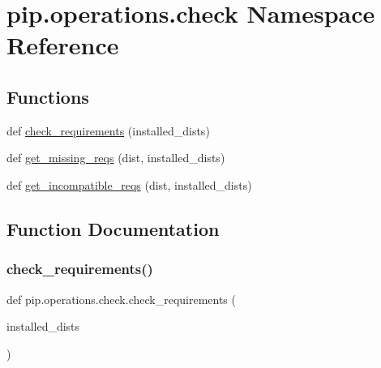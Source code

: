 \hypertarget{namespacepip_1_1operations_1_1check}{}\section{pip.\+operations.\+check Namespace Reference}
\label{namespacepip_1_1operations_1_1check}
\subsection*{Functions}
\begin{DoxyCompactItemize}
\item 
def \hyperlink{namespacepip_1_1operations_1_1check_a9bb13580a249c6a12a0f5d6055e2ce89}{check\+\_\+requirements} (installed\+\_\+dists)
\item 
def \hyperlink{namespacepip_1_1operations_1_1check_a8144e204678212ff692cc906ad803418}{get\+\_\+missing\+\_\+reqs} (dist, installed\+\_\+dists)
\item 
def \hyperlink{namespacepip_1_1operations_1_1check_a63bea8d327dc115fa6bc1458193f340c}{get\+\_\+incompatible\+\_\+reqs} (dist, installed\+\_\+dists)
\end{DoxyCompactItemize}


\subsection{Function Documentation}
\mbox{\label{namespacepip_1_1operations_1_1check_a9bb13580a249c6a12a0f5d6055e2ce89}} 
\subsubsection{\texorpdfstring{check\+\_\+requirements()}{check\_requirements()}}
{\footnotesize\ttfamily def pip.\+operations.\+check.\+check\+\_\+requirements (\begin{DoxyParamCaption}\item[{}]{installed\+\_\+dists }\end{DoxyParamCaption})}

\mbox{\label{namespacepip_1_1operations_1_1check_a63bea8d327dc115fa6bc1458193f340c}} 
